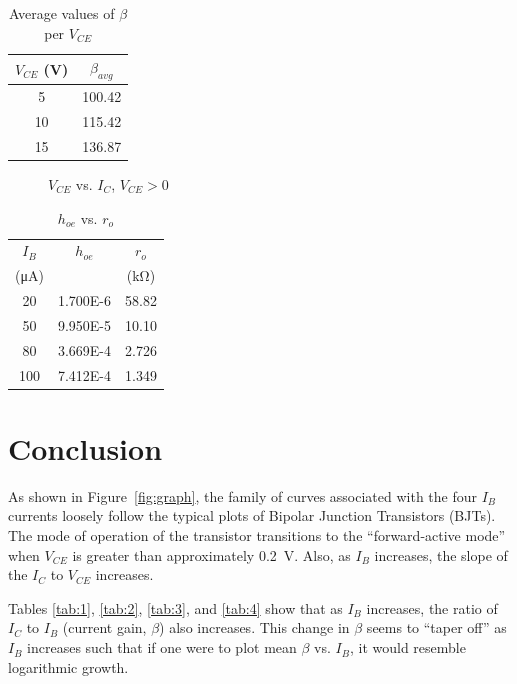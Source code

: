 \begin{table}[hbtp]
  \centering
  \begin{tabular}{cc}
    $V_{CE}$ (\si{V}) & $\beta_{avg}$ \\
    \hline
    5                 & 100.42        \\
    10                & 115.42        \\
    15                & 136.87        \\
  \end{tabular}
  \caption{\label{tab:beta_VCE} Average values of $\beta$ per $V_{CE}$}
\end{table}

\begin{figure}[hbtp]
  \centering
  \resizebox{1.0\textwidth}{!}{}
  \caption{\label{fig:graph2} $V_{CE}$ vs. $I_C$, $V_{CE} > 0$}
\end{figure}

\begin{table}[hbtp]
  \centering
  \begin{tabular}{ccc}
    $I_B$                & $h_{oe}$ & $r_o$            \\
    (\si{\micro\ampere}) &          & (\si{\kilo\ohm}) \\
    \hline
     20                  & 1.700E-6 & 58.82            \\
     50                  & 9.950E-5 & 10.10            \\
     80                  & 3.669E-4 & 2.726            \\
    100                  & 7.412E-4 & 1.349            \\
  \end{tabular}
  \caption{\label{tab:hoe} $h_{oe}$ vs. $r_o$}
\end{table}

\newpage
\section{Conclusion}
\label{sec:conclusion}

As shown in Figure~\ref{fig:graph}, the family of curves associated with the four $I_B$ currents loosely follow the typical plots of Bipolar Junction Transistors (BJTs).  The mode of operation of the transistor transitions to the “forward-active mode” when $V_{CE}$ is  greater than approximately \SI{0.2}{V}.  Also, as $I_B$ increases, the slope of the $I_C$ to $V_{CE}$ increases.

Tables \ref{tab:1}, \ref{tab:2}, \ref{tab:3}, and \ref{tab:4} show that as $I_B$ increases, the ratio of $I_C$ to $I_B$ (current gain, $\beta$) also increases.  This change in $\beta$ seems to ``taper off'' as $I_B$ increases such that if one were to plot mean $\beta$ vs. $I_B$, it would resemble logarithmic growth.  %

